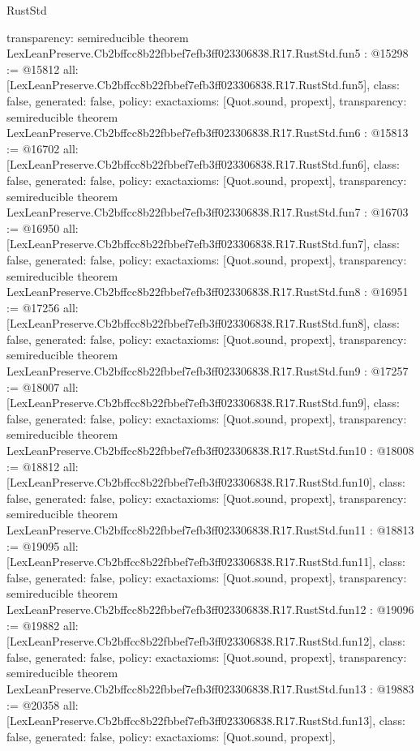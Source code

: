 \begin{lexlean}{RustStd}
\begin{coremodule}
{  transparency: semireducible
}
theorem LexLeanPreserve.Cb2bffcc8b22fbbef7efb3ff023306838.R17.RustStd.fun5 : @15298 := @15812 {
  all: [LexLeanPreserve.Cb2bffcc8b22fbbef7efb3ff023306838.R17.RustStd.fun5],
  class: false,
  generated: false,
  policy: exact{axioms: [Quot.sound, propext]},
  transparency: semireducible
}
theorem LexLeanPreserve.Cb2bffcc8b22fbbef7efb3ff023306838.R17.RustStd.fun6 : @15813 := @16702 {
  all: [LexLeanPreserve.Cb2bffcc8b22fbbef7efb3ff023306838.R17.RustStd.fun6],
  class: false,
  generated: false,
  policy: exact{axioms: [Quot.sound, propext]},
  transparency: semireducible
}
theorem LexLeanPreserve.Cb2bffcc8b22fbbef7efb3ff023306838.R17.RustStd.fun7 : @16703 := @16950 {
  all: [LexLeanPreserve.Cb2bffcc8b22fbbef7efb3ff023306838.R17.RustStd.fun7],
  class: false,
  generated: false,
  policy: exact{axioms: [Quot.sound, propext]},
  transparency: semireducible
}
theorem LexLeanPreserve.Cb2bffcc8b22fbbef7efb3ff023306838.R17.RustStd.fun8 : @16951 := @17256 {
  all: [LexLeanPreserve.Cb2bffcc8b22fbbef7efb3ff023306838.R17.RustStd.fun8],
  class: false,
  generated: false,
  policy: exact{axioms: [Quot.sound, propext]},
  transparency: semireducible
}
theorem LexLeanPreserve.Cb2bffcc8b22fbbef7efb3ff023306838.R17.RustStd.fun9 : @17257 := @18007 {
  all: [LexLeanPreserve.Cb2bffcc8b22fbbef7efb3ff023306838.R17.RustStd.fun9],
  class: false,
  generated: false,
  policy: exact{axioms: [Quot.sound, propext]},
  transparency: semireducible
}
theorem LexLeanPreserve.Cb2bffcc8b22fbbef7efb3ff023306838.R17.RustStd.fun10 : @18008 := @18812 {
  all: [LexLeanPreserve.Cb2bffcc8b22fbbef7efb3ff023306838.R17.RustStd.fun10],
  class: false,
  generated: false,
  policy: exact{axioms: [Quot.sound, propext]},
  transparency: semireducible
}
theorem LexLeanPreserve.Cb2bffcc8b22fbbef7efb3ff023306838.R17.RustStd.fun11 : @18813 := @19095 {
  all: [LexLeanPreserve.Cb2bffcc8b22fbbef7efb3ff023306838.R17.RustStd.fun11],
  class: false,
  generated: false,
  policy: exact{axioms: [Quot.sound, propext]},
  transparency: semireducible
}
theorem LexLeanPreserve.Cb2bffcc8b22fbbef7efb3ff023306838.R17.RustStd.fun12 : @19096 := @19882 {
  all: [LexLeanPreserve.Cb2bffcc8b22fbbef7efb3ff023306838.R17.RustStd.fun12],
  class: false,
  generated: false,
  policy: exact{axioms: [Quot.sound, propext]},
  transparency: semireducible
}
theorem LexLeanPreserve.Cb2bffcc8b22fbbef7efb3ff023306838.R17.RustStd.fun13 : @19883 := @20358 {
  all: [LexLeanPreserve.Cb2bffcc8b22fbbef7efb3ff023306838.R17.RustStd.fun13],
  class: false,
  generated: false,
  policy: exact{axioms: [Quot.sound, propext]},
}
\end{coremodule}
\end{lexlean}
